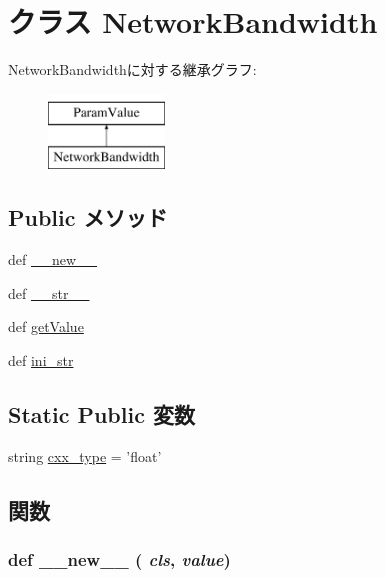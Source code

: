 \hypertarget{classm5_1_1params_1_1NetworkBandwidth}{
\section{クラス NetworkBandwidth}
\label{classm5_1_1params_1_1NetworkBandwidth}
}
NetworkBandwidthに対する継承グラフ:\begin{figure}[H]
\begin{center}
\leavevmode
\includegraphics[height=2cm]{classm5_1_1params_1_1NetworkBandwidth}
\end{center}
\end{figure}
\subsection*{Public メソッド}
\begin{DoxyCompactItemize}
\item 
def \hyperlink{classm5_1_1params_1_1NetworkBandwidth_a2f15a4676204349e06bcced484b06b70}{\_\-\_\-new\_\-\_\-}
\item 
def \hyperlink{classm5_1_1params_1_1NetworkBandwidth_aa7a4b9bc0941308e362738503137460e}{\_\-\_\-str\_\-\_\-}
\item 
def \hyperlink{classm5_1_1params_1_1NetworkBandwidth_acc340fbd4335fa34f9d57fb454b28ed0}{getValue}
\item 
def \hyperlink{classm5_1_1params_1_1NetworkBandwidth_a33ebe6cd32bcbd15465fc28b9d94bf82}{ini\_\-str}
\end{DoxyCompactItemize}
\subsection*{Static Public 変数}
\begin{DoxyCompactItemize}
\item 
string \hyperlink{classm5_1_1params_1_1NetworkBandwidth_a2f1553ebb79374a68b36fdd6d8d82fc3}{cxx\_\-type} = 'float'
\end{DoxyCompactItemize}


\subsection{関数}
\hypertarget{classm5_1_1params_1_1NetworkBandwidth_a2f15a4676204349e06bcced484b06b70}{
\subsubsection[{\_\-\_\-new\_\-\_\-}]{\setlength{\rightskip}{0pt plus 5cm}def \_\-\_\-new\_\-\_\- ( {\em cls}, \/   {\em value})}}
\label{classm5_1_1params_1_1NetworkBandwidth_a2f15a4676204349e06bcced484b06b70}



